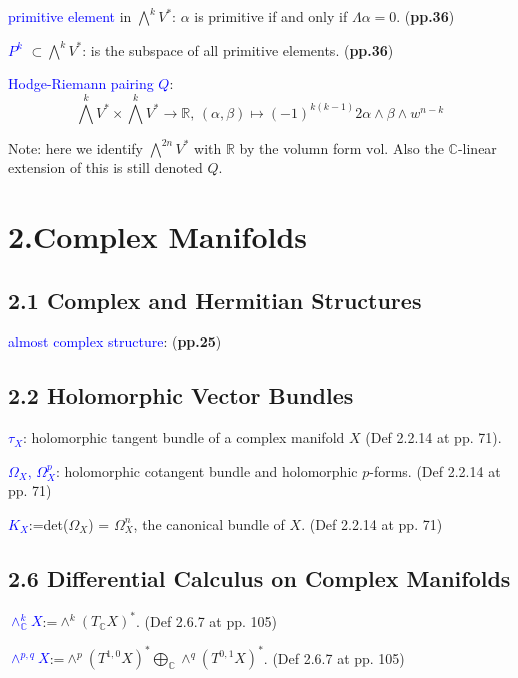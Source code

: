 \documentclass{book}
\numberwithin{equation}{subsection} %
\theoremstyle{definition}
\begin{document}
    \textcolor{blue}{primitive element} in $\bigwedge^kV^*$:
        $\alpha$ is primitive if and only if $\Lambda\alpha=0$.
    (\textbf{pp.36})

    \textcolor{blue}{$P^k$} $\subset\bigwedge^kV^*$: is the subspace
    of all primitive elements.
    (\textbf{pp.36})

    \textcolor{blue}{Hodge-Riemann pairing $Q$}:
    $$\bigwedge^kV^*\times\bigwedge^kV^*\to \mathbb{R}\text{, }
     (\alpha,\beta)\mapsto (-1)^{k(k-1)}{2}\alpha\wedge\beta\wedge w^{n-k}$$

    Note: here we identify $\bigwedge^{2n}V^*$ with $\mathbb{R}$ 
    by the volumn form $\text{vol}$. Also the $\mathbb{C}$-linear 
    extension of this is still denoted $Q$.

\section{2.Complex Manifolds}

    \subsection{2.1 Complex and Hermitian Structures}
    \textcolor{blue}{almost complex structure}: (\textbf{pp.25})
	\subsection{2.2 Holomorphic Vector Bundles}

    \textcolor{blue}{$\tau_X$}: holomorphic tangent bundle of a complex manifold $X$ (Def 2.2.14 at pp. 71).
    
    \textcolor{blue}{$\varOmega_X$, $\varOmega^p_X$}: holomorphic cotangent bundle and holomorphic $p$-forms. (Def 2.2.14 at pp. 71)
    
    \textcolor{blue}{$K_X$}:=det($\varOmega_X$) = $\varOmega_X^n$, the canonical bundle of $X$. (Def 2.2.14 at pp. 71)

    \subsection{2.6 Differential Calculus on Complex Manifolds}

    \textcolor{blue}{$\wedge^k_{\mathbb{C}}X$}:=$\wedge^k(T_{\mathbb{C}}X)^*$. (Def 2.6.7 at pp. 105)
    
    \textcolor{blue}{$\wedge^{p,q}X$}:=$\wedge^p(T^{1,0}X)^*
                        \bigoplus_{\mathbb{C}}\wedge^q(T^{0,1}X)^*$. (Def 2.6.7 at pp. 105)
\end{document}
